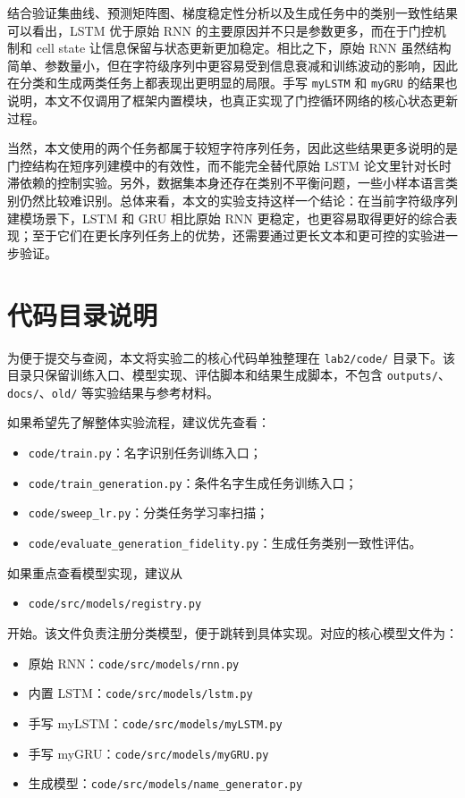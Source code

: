 \documentclass[a4paper]{article}
\begin{document}
结合验证集曲线、预测矩阵图、梯度稳定性分析以及生成任务中的类别一致性结果可以看出，LSTM 优于原始 RNN 的主要原因并不只是参数更多，而在于门控机制和 cell state 让信息保留与状态更新更加稳定。相比之下，原始 RNN 虽然结构简单、参数量小，但在字符级序列中更容易受到信息衰减和训练波动的影响，因此在分类和生成两类任务上都表现出更明显的局限。手写 \texttt{myLSTM} 和 \texttt{myGRU} 的结果也说明，本文不仅调用了框架内置模块，也真正实现了门控循环网络的核心状态更新过程。

当然，本文使用的两个任务都属于较短字符序列任务，因此这些结果更多说明的是门控结构在短序列建模中的有效性，而不能完全替代原始 LSTM 论文里针对长时滞依赖的控制实验。另外，数据集本身还存在类别不平衡问题，一些小样本语言类别仍然比较难识别。总体来看，本文的实验支持这样一个结论：在当前字符级序列建模场景下，LSTM 和 GRU 相比原始 RNN 更稳定，也更容易取得更好的综合表现；至于它们在更长序列任务上的优势，还需要通过更长文本和更可控的实验进一步验证。

\newpage
\appendix
\section{代码目录说明}
为便于提交与查阅，本文将实验二的核心代码单独整理在 \texttt{lab2/code/} 目录下。该目录只保留训练入口、模型实现、评估脚本和结果生成脚本，不包含 \texttt{outputs/}、\texttt{docs/}、\texttt{old/} 等实验结果与参考材料。

如果希望先了解整体实验流程，建议优先查看：
\begin{itemize}
    \item \texttt{code/train.py}：名字识别任务训练入口；
    \item \texttt{code/train\_generation.py}：条件名字生成任务训练入口；
    \item \texttt{code/sweep\_lr.py}：分类任务学习率扫描；
    \item \texttt{code/evaluate\_generation\_fidelity.py}：生成任务类别一致性评估。
\end{itemize}

如果重点查看模型实现，建议从
\begin{itemize}
    \item \texttt{code/src/models/registry.py}
\end{itemize}
开始。该文件负责注册分类模型，便于跳转到具体实现。对应的核心模型文件为：
\begin{itemize}
    \item 原始 RNN：\texttt{code/src/models/rnn.py}
    \item 内置 LSTM：\texttt{code/src/models/lstm.py}
    \item 手写 myLSTM：\texttt{code/src/models/myLSTM.py}
    \item 手写 myGRU：\texttt{code/src/models/myGRU.py}
    \item 生成模型：\texttt{code/src/models/name\_generator.py}
\end{itemize}
\end{document}

